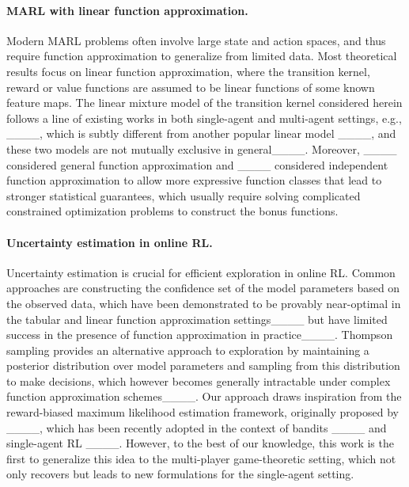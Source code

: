 \paragraph{MARL with linear function approximation.} Modern MARL problems often involve large state and action spaces, and thus require function approximation to generalize from limited data. Most theoretical results focus on linear function approximation, where the transition kernel, reward or value functions are assumed to be linear functions of some known feature maps. The linear mixture model of the transition kernel considered herein follows a line of existing works in both single-agent and multi-agent settings, e.g., ____, which is subtly different from another popular linear model ____, and these two models are not mutually exclusive in general____. Moreover, ____ considered general function approximation and ____ considered independent function approximation to allow more expressive function classes that lead to stronger statistical guarantees, which usually require solving complicated constrained optimization problems to construct the bonus functions. 

\paragraph{Uncertainty estimation in online RL.} Uncertainty estimation is crucial for efficient exploration in online RL. Common approaches are constructing the confidence set of the model parameters based on the observed data, which have been demonstrated to be provably near-optimal in the tabular and linear function approximation settings____ but have  limited success in the presence of function approximation in practice____. Thompson sampling provides an alternative approach to exploration by maintaining a posterior distribution over model parameters and sampling from this distribution to make decisions, which however becomes generally intractable under complex function approximation schemes____. Our approach draws inspiration from the reward-biased maximum likelihood estimation framework, originally proposed by ____, which has been recently adopted in the context of bandits ____ and single-agent RL ____. However, to the best of our knowledge, this work is the first to generalize this idea to the multi-player game-theoretic setting, which not only recovers but leads to new formulations for the single-agent setting.